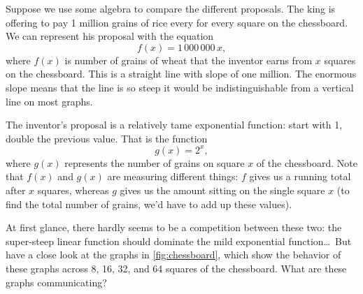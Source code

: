Suppose we use some algebra to compare the different proposals. The king is offering to pay 1 million grains of rice every for every square on the chessboard. We can represent his proposal with the equation
\[f(x)=1\,000\,000\,x,\]
where $f(x)$ is number of grains of wheat that the inventor earns from $x$ squares on the chessboard. This is a straight line with slope of one million. The enormous slope means that the line is so steep it would be indistinguishable from a vertical line on most graphs.

The inventor's proposal is a relatively tame exponential function: start with 1, double the previous value. That is the function
\[g(x)=2^x,\]
where $g(x)$ represents the number of grains on square $x$ of the chessboard. Note that $f(x)$ and $g(x)$ are measuring different things: $f$ gives us a running total after $x$ squares, whereas $g$ gives us the amount sitting on the single square $x$ (to find the total number of grains, we'd have to add up these values). 

At first glance, there hardly seems to be a competition between these two: the super-steep linear function should dominate the mild exponential function\ldots\ But have a close look at the graphs in \cref{fig:chessboard}, which show the behavior of these graphs across 8, 16, 32, and 64 squares of the chessboard. What are these graphs communicating?

\newcommand{\chessboard}[1]{
\begin{tikzpicture}
	\begin{axis}[
			clip=false,
			width=\linewidth,
			height=\linewidth,
			axis lines = middle,
			axis line style={thick, ->, shorten >=-10pt, shorten <=-10pt},
			xlabel={No. Squares},
			ylabel={No. Grains},
			grid=both,
			xlabel near ticks,
			ylabel near ticks,
			legend style={
				font=\footnotesize,
				legend pos=north west,
				cells={anchor=west},
				draw=black!25
			},
		]
		\addplot[algcurve, ->, green!50!black, domain=0:#1] (\x,2^x);
		\addlegendentry{$y=2^x$};
		\addplot[algcurve, ->, red, domain=0:#1] (\x,1000000);
		\addlegendentry{$y=1\,000\,000x$};
	\end{axis}
\end{tikzpicture}
}

